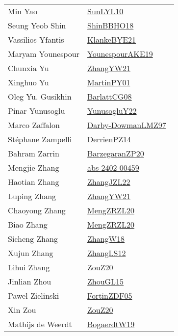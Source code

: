 {\begin{longtable}{p{4cm}p{20cm}}
Min Yao & \href{works/SunLYL10.pdf}{SunLYL10}~\cite{SunLYL10}\\
Seung Yeob Shin & \href{works/ShinBBHO18.pdf}{ShinBBHO18}~\cite{ShinBBHO18}\\
Vassilios Yfantis & \href{works/KlankeBYE21.pdf}{KlankeBYE21}~\cite{KlankeBYE21}\\
Maryam Younespour & \href{works/YounespourAKE19.pdf}{YounespourAKE19}~\cite{YounespourAKE19}\\
Chunxia Yu & \href{works/ZhangYW21.pdf}{ZhangYW21}~\cite{ZhangYW21}\\
Xinghuo Yu & \href{works/MartinPY01.pdf}{MartinPY01}~\cite{MartinPY01}\\
Oleg Yu. Gusikhin & \href{works/BarlattCG08.pdf}{BarlattCG08}~\cite{BarlattCG08}\\
Pinar Yunusoglu & \href{}{YunusogluY22}~\cite{YunusogluY22}\\
Marco Zaffalon & \href{works/Darby-DowmanLMZ97.pdf}{Darby-DowmanLMZ97}~\cite{Darby-DowmanLMZ97}\\
St{\'{e}}phane Zampelli & \href{works/DerrienPZ14.pdf}{DerrienPZ14}~\cite{DerrienPZ14}\\
Bahram Zarrin & \href{works/BarzegaranZP20.pdf}{BarzegaranZP20}~\cite{BarzegaranZP20}\\
Mengjie Zhang & \href{works/abs-2402-00459.pdf}{abs-2402-00459}~\cite{abs-2402-00459}\\
Haotian Zhang & \href{works/ZhangJZL22.pdf}{ZhangJZL22}~\cite{ZhangJZL22}\\
Luping Zhang & \href{works/ZhangYW21.pdf}{ZhangYW21}~\cite{ZhangYW21}\\
Chaoyong Zhang & \href{works/MengZRZL20.pdf}{MengZRZL20}~\cite{MengZRZL20}\\
Biao Zhang & \href{works/MengZRZL20.pdf}{MengZRZL20}~\cite{MengZRZL20}\\
Sicheng Zhang & \href{works/ZhangW18.pdf}{ZhangW18}~\cite{ZhangW18}\\
Xujun Zhang & \href{works/ZhangLS12.pdf}{ZhangLS12}~\cite{ZhangLS12}\\
Lihui Zhang & \href{}{ZouZ20}~\cite{ZouZ20}\\
Jinlian Zhou & \href{works/ZhouGL15.pdf}{ZhouGL15}~\cite{ZhouGL15}\\
Pawel Zielinski & \href{works/FortinZDF05.pdf}{FortinZDF05}~\cite{FortinZDF05}\\
Xin Zou & \href{}{ZouZ20}~\cite{ZouZ20}\\
Mathijs de Weerdt & \href{works/BogaerdtW19.pdf}{BogaerdtW19}~\cite{BogaerdtW19}\\

\end{longtable}}
